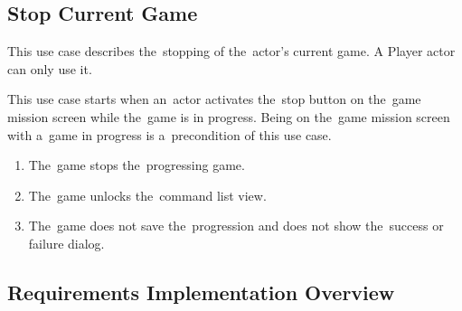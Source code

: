 \subsection{Stop Current Game}

This use case describes the~stopping of the~actor's current game.
A Player actor can only use it.

This use case starts when an~actor activates the~stop button on the~game mission screen while the~game is in progress.
Being on the~game mission screen with a~game in progress is a~precondition of this use case.

\begin{enumerate}
    \item The~game stops the~progressing game.
    \item The~game unlocks the~command list view.
    \item The~game does not save the~progression and does not show the~success or failure dialog. 
\end{enumerate}

\let\thesubsection=\oldsubsection

\subsection{Requirements Implementation Overview}

